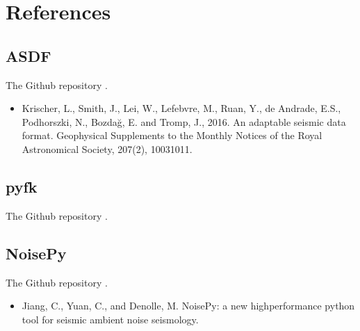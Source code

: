 \documentclass[a4paper,10pt,english,openany]{sphinxmanual}
\begin{document}
\begin{sphinxVerbatim}[commandchars=\\\{\},numbers=left,firstnumber=1,stepnumber=1]
  
 
\end{sphinxVerbatim}



\section{References}
\label{\detokenize{references:references}}\label{\detokenize{references::doc}}

\subsection{ASDF}
\label{\detokenize{references:asdf}}
The  Github repository .
\begin{itemize}
\item {} 
Krischer, L., Smith, J., Lei, W., Lefebvre, M., Ruan, Y., de Andrade, E.S., Podhorszki, N., Bozdağ, E.
and Tromp, J., 2016. An adaptable seismic data format. Geophysical Supplements to the Monthly Notices
of the Royal Astronomical Society, 207(2), 1003\sphinxhyphen{}1011.

\end{itemize}


\subsection{pyfk}
\label{\detokenize{references:pyfk}}
The  Github repository .


\subsection{NoisePy}
\label{\detokenize{references:noisepy}}
The  Github repository .
\begin{itemize}
\item {} 
Jiang, C., Yuan, C., and Denolle, M. NoisePy: a new high\sphinxhyphen{}performance python tool for seismic
ambient noise seismology.

\end{itemize}
\end{document}
